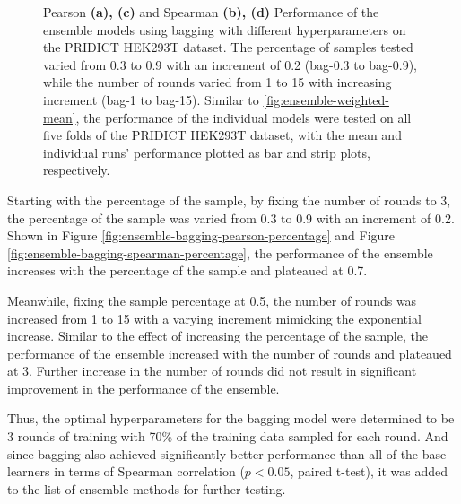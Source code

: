 \begin{figure}
    \centering
    \caption[Ensemble Model Performance]{Pearson \textbf{(a), (c)} and Spearman \textbf{(b), (d)} Performance of the ensemble models using bagging with different hyperparameters on the PRIDICT HEK293T dataset. The percentage of samples tested varied from 0.3 to 0.9 with an increment of 0.2 (bag-0.3 to bag-0.9), while the number of rounds varied from 1 to 15 with increasing increment (bag-1 to bag-15). Similar to \autoref{fig:ensemble-weighted-mean}, the performance of the individual models were tested on all five folds of the PRIDICT HEK293T dataset, with the mean and individual runs' performance plotted as bar and strip plots, respectively.}
    \label{fig:ensemble-bagging-tuning}
\end{figure}

Starting with the percentage of the sample, by fixing the number of rounds to 3, the percentage of the sample was varied from 0.3 to 0.9 with an increment of 0.2. Shown in Figure \ref{fig:ensemble-bagging-pearson-percentage} and Figure \ref{fig:ensemble-bagging-spearman-percentage}, the performance of the ensemble increases with the percentage of the sample and plateaued at 0.7. 

Meanwhile, fixing the sample percentage at 0.5, the number of rounds was increased from 1 to 15 with a varying increment mimicking the exponential increase. Similar to the effect of increasing the percentage of the sample, the performance of the ensemble increased with the number of rounds and plateaued at 3. Further increase in the number of rounds did not result in significant improvement in the performance of the ensemble.

Thus, the optimal hyperparameters for the bagging model were determined to be 3 rounds of training with 70\% of the training data sampled for each round. And since bagging also achieved significantly better performance than all of the base learners in terms of Spearman correlation ($p<0.05$, paired t-test), it was added to the list of ensemble methods for further testing.

